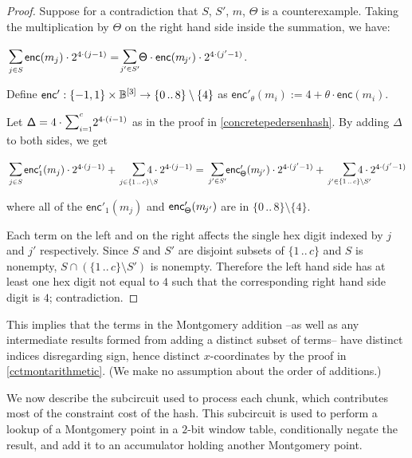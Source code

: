 \documentclass{article}
\newcommand{\crossref}[1]{\autoref{#1}}
\newcommand{\typecolon}{:}
\newcommand{\bit}{\mathbb{B}}
\newcommand{\typeexp}[2]{{#1}\vphantom{)}^{[{#2}]}}
\newcommand{\bitseq}[1]{\typeexp{\bit}{#1}}
\newcommand{\setof}[1]{\{{#1}\}}
\newcommand{\barerange}[2]{{{#1}\,..\,{#2}}}
\newcommand{\range}[2]{\setof{\barerange{#1}{#2}}}
\newcommand{\vop}[3]{\,\raisebox{0.29ex}{\scalebox{0.89}{$\smashoperator[r]{#3_{#1}^{#2}}$\,}}}
\newcommand{\sop}[3]{\!\scalebox{0.89}{$\scalebox{1.404}{$\strut#3$}_{#1}^{#2}$}}
\newcommand{\vsum}[2]{\vop{#1}{#2}{\sum}}
\newcommand{\ssum}[2]{\sop{#1}{#2}{\sum}}
\newcommand{\mult}{\cdot}
\newcommand{\intersection}{\cap}
\newcommand{\enc}{\mathsf{enc}}
\newcommand{\PedersenRangeOffset}{\mathsf{\Delta}}
\newcommand{\Sign}{\mathsf{\Theta}}
\begin{document}
\begin{proof}
Suppose for a contradiction that $S$, $S'$, $m$, $\Sign$ is a counterexample. Taking the multiplication
by $\Sign$ on the right hand side inside the summation, we have:
\begin{formulae}
  \item $\vsum{j \in S\vphantom{S'}}{} \enc(m_j) \mult 2^{4 \mult (j-1)} =
         \!\!\vsum{j' \in S'}{} \Sign \mult \enc(m_{\kern -0.1em j'}) \mult 2^{4 \mult (j'-1)}$.
\end{formulae}

Define $\enc' \typecolon \setof{-1, 1} \times \bitseq{3} \rightarrow \range{0}{8} \setminus \setof{4}$ as
$\enc'_\theta(m_i) := 4 + \theta \mult \enc(m_i)$.

Let $\PedersenRangeOffset = 4 \mult \ssum{i=1}{c} 2^{4 \mult (i-1)}$
as in the proof in \crossref{concretepedersenhash}.
By adding $\PedersenRangeOffset$ to both sides, we get
\begin{formulae}
  \item $\vsum{j \in S\vphantom{S'}}{} \enc'_1(m_j) \mult 2^{4 \mult (j-1)} + \vsum{j \in \range{1}{c} \setminus S\vphantom{S'}}{} 4 \mult 2^{4 \mult (j-1)} =
         \vsum{j' \in S'}{} \enc'_{\Sign}(m_{\kern -0.1em j'}) \mult 2^{4 \mult (j'-1)} + \vsum{j' \in \range{1}{c} \setminus S'}{} 4 \mult 2^{4 \mult (j'-1)}$
\end{formulae}
\vspace{-1ex}
where all of the $\enc'_1(m_j)$ and $\enc'_{\Sign}(m_{\kern -0.1em j'})$ are in $\range{0}{8} \setminus \setof{4}$.

Each term on the left and on the right affects the single hex digit indexed by
$j$ and $j'$ respectively. Since $S$ and $S'$ are disjoint subsets of $\range{1}{c}$
and $S$ is nonempty, $S \intersection (\range{1}{c} \setminus S')$ is nonempty.
Therefore the left hand side has at least one hex digit not equal to $4$ such that
the corresponding right hand side digit is $4$; contradiction.
\end{proof}

This implies that the terms in the Montgomery addition --as well as any intermediate
results formed from adding a distinct subset of terms-- have distinct indices
disregarding sign, hence distinct $x$-coordinates by the proof in \crossref{cctmontarithmetic}.
(We make no assumption about the order of additions.)

We now describe the subcircuit used to process each chunk, which contributes most of
the constraint cost of the hash. This subcircuit is used to perform a lookup of a
Montgomery point in a $2$-bit window table, conditionally negate the result, and add
it to an accumulator holding another Montgomery point.
\end{document}
